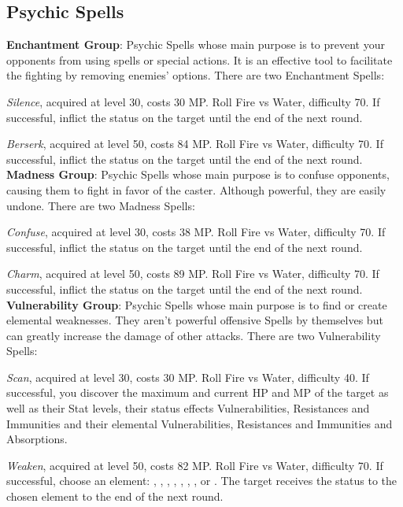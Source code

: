 \begin{multicols}{2}
    \subsection{Psychic Spells}\label{subsec:white-psychic}

    \textbf{Enchantment Group}: Psychic Spells whose main purpose is to prevent your opponents from using spells or special actions. It is an effective tool to facilitate the fighting by removing enemies’ options. There are two Enchantment Spells:

    \textit{Silence}, acquired at level 30, costs 30 MP\@. Roll Fire vs Water, difficulty 70. If successful, inflict the  status on the target until the end of the next round.

    \textit{Berserk}, acquired at level 50, costs 84 MP\@. Roll Fire vs Water, difficulty 70. If successful, inflict the  status on the target until the end of the next round.\\%

    \textbf{Madness Group}: Psychic Spells whose main purpose is to confuse opponents, causing them to fight in favor of the caster. Although powerful, they are easily undone. There are two Madness Spells:

    \textit{Confuse}, acquired at level 30, costs 38 MP\@. Roll Fire vs Water, difficulty 70. If successful, inflict the  status on the target until the end of the next round.

    \textit{Charm}, acquired at level 50, costs 89 MP\@. Roll Fire vs Water, difficulty 70. If successful, inflict the  status on the target until the end of the next round.\\%

    \textbf{Vulnerability Group}: Psychic Spells whose main purpose is to find or create elemental weaknesses. They aren’t powerful offensive Spells by themselves but can greatly increase the damage of other attacks. There are two Vulnerability Spells:

    \textit{Scan}, acquired at level 30, costs 30 MP\@. Roll Fire vs Water, difficulty 40. If successful, you discover the maximum and current HP and MP of the target as well as their Stat levels, their status effects Vulnerabilities, Resistances and Immunities and their elemental Vulnerabilities, Resistances and Immunities and Absorptions.

    \textit{Weaken}, acquired at level 50, costs 82 MP\@. Roll Fire vs Water, difficulty 70. If successful, choose an element: , , , , , , ,  or . The target receives the status  to the chosen element to the end of the next round. 


\end{multicols}
